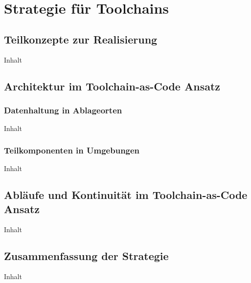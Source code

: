 \section{Strategie für Toolchains}
\label{sec:05-02_strategy-for-toolchains}

\subsection{Teilkonzepte zur Realisierung}
\label{subsec:05-02-01_sub-concepts-for-implementation}

Inhalt

\subsection{Architektur im Toolchain-as-Code Ansatz}
\label{subsec:05-02-02_architecture-in-the-toolchain-as-code-approach}

\subsubsection{Datenhaltung in Ablageorten}
\label{subsubsec:05-02-02-01_data-storage-in-repositories}

Inhalt

\subsubsection{Teilkomponenten in Umgebungen}
\label{subsubsec:05-02-02-02_sub-components-in-environments}

Inhalt

\subsection{Abläufe und Kontinuität im Toolchain-as-Code Ansatz}
\label{subsec:05-02-03_workflows-and-continuity-in-the-toolchain-as-code-approach}

Inhalt

\subsection{Zusammenfassung der Strategie}
\label{subsec:05-02-04_summary-of-strategy}

Inhalt
